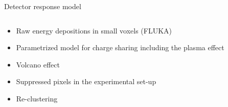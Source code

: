 \documentclass{beamer}
\begin{document}
\begin{frame}{\centering Detector response model}
  \begin{columns}
    \begin{column}{0.45\textwidth}
      \begin{itemize}
      \item<1->{Raw energy depositions in small voxels (FLUKA)}
      \item<2->{Parametrized model for charge sharing including the plasma effect}
      \item<3->{Volcano effect}
      \item<4->{Suppressed pixels in the experimental set-up}
      \item<4->{Re-clustering}
      \end{itemize}
    \end{column}
    \begin{column}{0.55\textwidth}
\end{column}
\end{columns}
\end{frame}
\end{document}
